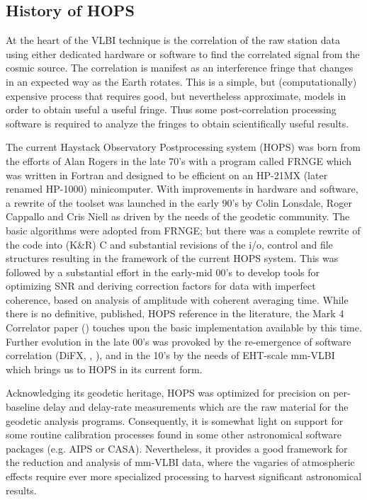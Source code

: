 \subsection{History of HOPS}
\label{sec:histhops}

At the heart of the VLBI technique is the correlation of the raw
station data using either dedicated hardware or software to find
the correlated signal from the cosmic source.  The correlation is
manifest as an interference fringe that changes in an expected way
as the Earth rotates.  This is a simple, but (computationally)
expensive process that requires good, but nevertheless approximate,
models in order to obtain useful a useful fringe.  Thus some
post-correlation processing software is required to analyze the
fringes to obtain scientifically useful results.

The current Haystack Observatory Postprocessing system (HOPS) was
born from the efforts of Alan Rogers in the late 70's with a program
called FRNGE which was written in Fortran and designed to be efficient
on an HP-21MX (later renamed HP-1000) minicomputer.  With improvements
in hardware and software, a rewrite of the toolset was launched in
the early 90's by Colin Lonsdale, Roger Cappallo and Cris Niell as
driven by the needs of the geodetic community.  The basic algorithms
were adopted from FRNGE; but there was a complete rewrite of the code
into (K\&R) C and substantial revisions of the i/o, control and file
structures resulting in the framework of the current HOPS system.
This was followed by a substantial effort in the early-mid
00's to develop tools for optimizing SNR and deriving correction factors
for data with imperfect coherence, based on analysis of amplitude with
coherent averaging time.
While there is no definitive, published, HOPS reference in the literature,
the Mark 4 Correlator paper (\cite{whitney2004mark}) touches upon the basic
implementation available by this time.
Further evolution in the late 00's was provoked
by the re-emergence of software correlation
(DiFX, \cite{deller2007difx}, \cite{deller2011difx}),
and in the 10's by the
needs of EHT-scale mm-VLBI which brings us to HOPS in its current form.

Acknowledging its geodetic heritage, HOPS was optimized for precision
on per-baseline delay and delay-rate measurements which are the raw
material for the geodetic analysis programs.  Consequently, it is
somewhat light on support for some routine calibration processes found
in some other astronomical software packages (e.g. AIPS or CASA).
Nevertheless, it provides a good framework for the reduction and
analysis of mm-VLBI data, where the vagaries of atmospheric effects
require ever more specialized processing to harvest significant
astronomical results.

